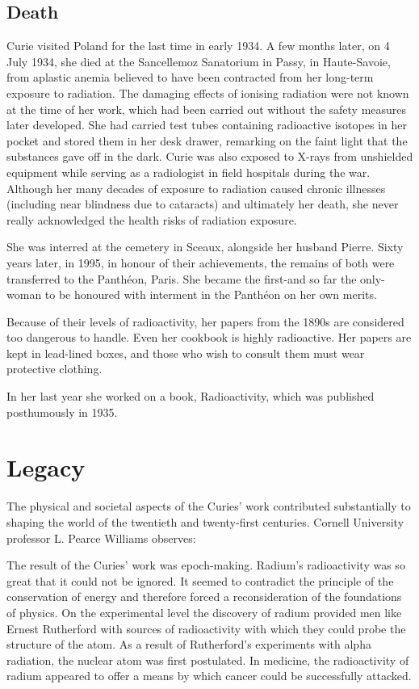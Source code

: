 \documentclass[12pt,a4paper]{article}
\begin{document}
\subsection{Death} 
Curie visited Poland for the last time in early 1934. A few months later, on 4 July 1934, she died at the Sancellemoz Sanatorium in Passy, in Haute-Savoie, from aplastic anemia believed to have been contracted from her long-term exposure to radiation. The damaging effects of ionising radiation were not known at the time of her work, which had been carried out without the safety measures later developed. She had carried test tubes containing radioactive isotopes in her pocket and stored them in her desk drawer, remarking on the faint light that the substances gave off in the dark. Curie was also exposed to X-rays from unshielded equipment while serving as a radiologist in field hospitals during the war. Although her many decades of exposure to radiation caused chronic illnesses (including near blindness due to cataracts) and ultimately her death, she never really acknowledged the health risks of radiation exposure.

She was interred at the cemetery in Sceaux, alongside her husband Pierre. Sixty years later, in 1995, in honour of their achievements, the remains of both were transferred to the Panth\'eon, Paris. She became the first-and so far the only-woman to be honoured with interment in the Panth\'eon on her own merits.

Because of their levels of radioactivity, her papers from the 1890s are considered too dangerous to handle. Even her cookbook is highly radioactive. Her papers are kept in lead-lined boxes, and those who wish to consult them must wear protective clothing.

In her last year she worked on a book, Radioactivity, which was published posthumously in 1935.


\section{Legacy} 
The physical and societal aspects of the Curies' work contributed substantially to shaping the world of the twentieth and twenty-first centuries. Cornell University professor L. Pearce Williams observes:

    The result of the Curies' work was epoch-making. Radium's radioactivity was so great that it could not be ignored. It seemed to contradict the principle of the conservation of energy and therefore forced a reconsideration of the foundations of physics. On the experimental level the discovery of radium provided men like Ernest Rutherford with sources of radioactivity with which they could probe the structure of the atom. As a result of Rutherford's experiments with alpha radiation, the nuclear atom was first postulated. In medicine, the radioactivity of radium appeared to offer a means by which cancer could be successfully attacked.
\end{document}
